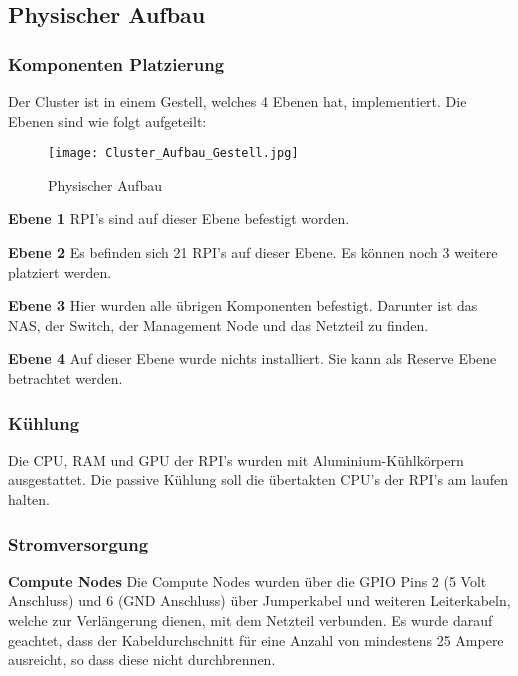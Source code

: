 \subsection{Physischer Aufbau}

\subsubsection{Komponenten Platzierung}
Der Cluster ist in einem Gestell, welches 4 Ebenen hat, implementiert. Die Ebenen sind wie folgt aufgeteilt: \newline

\begin{figure}[htb]
\centering
\texttt{[image: Cluster\_Aufbau\_Gestell.jpg]}
\caption{Physischer Aufbau}
\label{fig:Physischer Aufbau}
\end{figure} 

\textbf{Ebene 1} RPI's sind auf dieser Ebene befestigt worden.

\textbf{Ebene 2}\newline
Es befinden sich 21 RPI's auf dieser Ebene. Es können noch 3 weitere platziert werden.

\textbf{Ebene 3}\newline
Hier wurden alle übrigen Komponenten befestigt. Darunter ist das NAS, der Switch, der Management Node und das Netzteil zu finden.

\textbf{Ebene 4}\newline
Auf dieser Ebene wurde nichts installiert. Sie kann als Reserve Ebene betrachtet werden.

\subsubsection{Kühlung}
Die CPU, RAM und GPU der RPI's wurden mit Aluminium-Kühlkörpern ausgestattet. Die passive Kühlung soll die übertakten CPU's der RPI's am laufen halten.

\subsubsection{Stromversorgung}
\textbf{Compute Nodes}\newline
Die Compute Nodes wurden über die GPIO Pins 2 (5 Volt Anschluss) und 6 (GND Anschluss) über Jumperkabel und weiteren Leiterkabeln, welche zur Verlängerung dienen, mit dem Netzteil verbunden. Es wurde darauf geachtet, dass der Kabeldurchschnitt für eine Anzahl von mindestens 25 Ampere ausreicht, so dass diese nicht durchbrennen.


